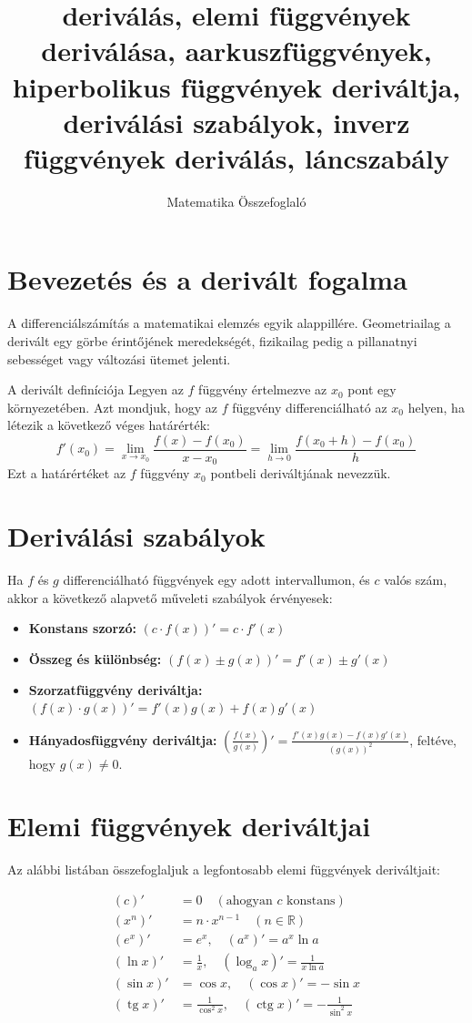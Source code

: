 \documentclass[11pt,a4paper]{article}
\title{deriválás, elemi függvények deriválása, aarkuszfüggvények, hiperbolikus függvények deriváltja, deriválási szabályok, inverz függvények deriválás, láncszabály}
\author{Matematika Összefoglaló}
\date{}
\begin{document}
\maketitle

\section{Bevezetés és a derivált fogalma}
A differenciálszámítás a matematikai elemzés egyik alappillére. Geometriailag a derivált egy görbe érintőjének meredekségét, fizikailag pedig a pillanatnyi sebességet vagy változási ütemet jelenti.

\begin{defbox}{A derivált definíciója}
Legyen az $f$ függvény értelmezve az $x_0$ pont egy környezetében. Azt mondjuk, hogy az $f$ függvény differenciálható az $x_0$ helyen, ha létezik a következő véges határérték:
\[
f'(x_0) = \lim_{x \to x_0} \frac{f(x) - f(x_0)}{x - x_0} = \lim_{h \to 0} \frac{f(x_0 + h) - f(x_0)}{h}
\]
Ezt a határértéket az $f$ függvény $x_0$ pontbeli deriváltjának nevezzük.
\end{defbox}

\section{Deriválási szabályok}
Ha $f$ és $g$ differenciálható függvények egy adott intervallumon, és $c$ valós szám, akkor a következő alapvető műveleti szabályok érvényesek:

\begin{itemize}
    \item \textbf{Konstans szorzó:} $(c \cdot f(x))' = c \cdot f'(x)$
    \item \textbf{Összeg és különbség:} $(f(x) \pm g(x))' = f'(x) \pm g'(x)$
    \item \textbf{Szorzatfüggvény deriváltja:} $(f(x) \cdot g(x))' = f'(x)g(x) + f(x)g'(x)$
    \item \textbf{Hányadosfüggvény deriváltja:} $\left(\frac{f(x)}{g(x)}\right)' = \frac{f'(x)g(x) - f(x)g'(x)}{(g(x))^2}$, feltéve, hogy $g(x) \neq 0$.
\end{itemize}

\section{Elemi függvények deriváltjai}
Az alábbi listában összefoglaljuk a legfontosabb elemi függvények deriváltjait:

\begin{align*}
    (c)' &= 0 \quad (\text{ahogyan } c \text{ konstans}) \\
    (x^n)' &= n \cdot x^{n-1} \quad (n \in \mathbb{R}) \\
    (e^x)' &= e^x, \quad (a^x)' = a^x \ln a \\
    (\ln x)' &= \frac{1}{x}, \quad (\log_a x)' = \frac{1}{x \ln a} \\
    (\sin x)' &= \cos x, \quad (\cos x)' = -\sin x \\
    (\operatorname{tg} x)' &= \frac{1}{\cos^2 x}, \quad (\operatorname{ctg} x)' = -\frac{1}{\sin^2 x}
\end{align*}
\end{document}

